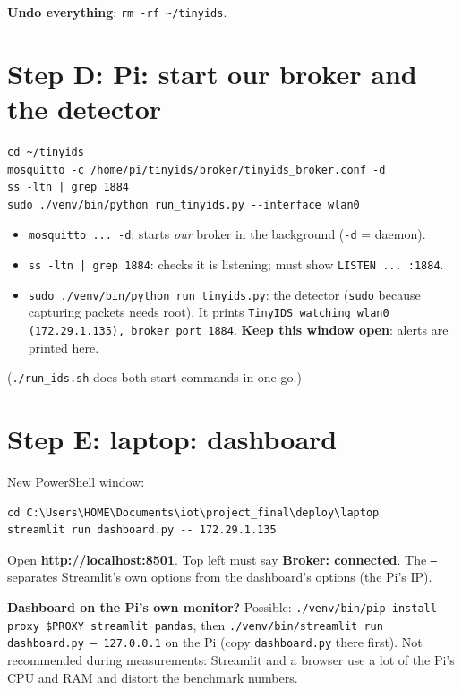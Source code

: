 \documentclass[11pt]{article}
\begin{document}
\textbf{Undo everything}: \texttt{rm -rf \textasciitilde/tinyids}.

\newpage
\section{Step D: Pi: start our broker and the detector}
\begin{Verbatim}[frame=single]
cd ~/tinyids
mosquitto -c /home/pi/tinyids/broker/tinyids_broker.conf -d
ss -ltn | grep 1884
sudo ./venv/bin/python run_tinyids.py --interface wlan0
\end{Verbatim}
\begin{itemize}
\item \texttt{mosquitto ... -d}: starts \emph{our} broker in the background (\texttt{-d} = daemon).
\item \texttt{ss -ltn | grep 1884}: checks it is listening; must show \texttt{LISTEN ... :1884}.
\item \texttt{sudo ./venv/bin/python run\_tinyids.py}: the detector (\texttt{sudo} because capturing packets needs root).
It prints \texttt{TinyIDS watching wlan0 (172.29.1.135), broker port 1884}. \textbf{Keep this window open}: alerts are printed here.
\end{itemize}
(\texttt{./run\_ids.sh} does both start commands in one go.)

\section{Step E: laptop: dashboard}
New PowerShell window:
\begin{Verbatim}[frame=single]
cd C:\Users\HOME\Documents\iot\project_final\deploy\laptop
streamlit run dashboard.py -- 172.29.1.135
\end{Verbatim}
Open \textbf{http://localhost:8501}. Top left must say \textbf{Broker: connected}.
The \texttt{--} separates Streamlit's own options from the dashboard's options (the Pi's IP).

\textbf{Dashboard on the Pi's own monitor?} Possible: \texttt{./venv/bin/pip install --proxy \$PROXY streamlit pandas}, then
\texttt{./venv/bin/streamlit run dashboard.py -- 127.0.0.1} on the Pi (copy \texttt{dashboard.py} there first). Not recommended during measurements:
Streamlit and a browser use a lot of the Pi's CPU and RAM and distort the benchmark numbers.
\end{document}
